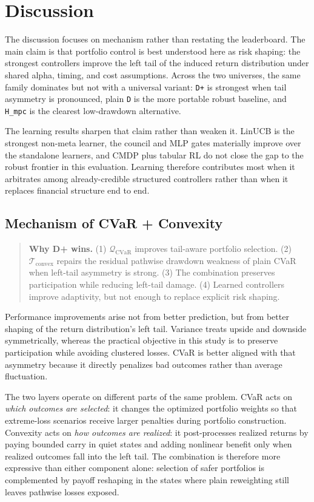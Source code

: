 \documentclass[10pt,twocolumn]{article}
\begin{document}
\section{Discussion}

The discussion focuses on mechanism rather than restating the leaderboard. The
main claim is that portfolio control is best understood here as risk shaping:
the strongest controllers improve the left tail of the induced return
distribution under shared alpha, timing, and cost assumptions. Across the two
universes, the same family dominates but not with a universal variant:
\texttt{D+} is strongest when tail asymmetry is pronounced, plain
\texttt{D} is the more portable robust baseline, and \texttt{H\_mpc} is the
clearest low-drawdown alternative.

The learning results sharpen that claim rather than weaken it. LinUCB is the
strongest non-meta learner, the council and MLP gates materially improve over
the standalone learners, and CMDP plus tabular RL do not close the gap to the
robust frontier in this evaluation. Learning therefore contributes most when it arbitrates among
already-credible structured controllers rather than when it replaces financial
structure end to end.

\subsection{Mechanism of CVaR + Convexity}

\begin{quote}\small\noindent\textbf{Why D+ wins.} (1) $\mathcal{Q}_{\text{CVaR}}$
improves tail-aware portfolio selection. (2)
$\mathcal{T}_{\text{convex}}$ repairs the residual pathwise drawdown weakness
of plain CVaR when left-tail asymmetry is strong. (3) The combination preserves
participation while reducing left-tail damage. (4) Learned controllers improve
adaptivity, but not enough to replace explicit risk shaping.\end{quote}

Performance improvements arise not from better prediction, but from better
shaping of the return distribution's left tail. Variance treats upside and
downside symmetrically, whereas the practical objective in this study is to
preserve participation while avoiding clustered losses. CVaR is better aligned
with that asymmetry because it directly penalizes bad outcomes rather than
average fluctuation.

The two layers operate on different parts of the same problem. CVaR acts on
\emph{which outcomes are selected}: it changes the optimized portfolio weights
so that extreme-loss scenarios receive larger penalties during portfolio
construction. Convexity acts on \emph{how outcomes are realized}: it
post-processes realized returns by paying bounded carry in quiet states and
adding nonlinear benefit only when realized outcomes fall into the left tail.
The combination is therefore more expressive than either component alone:
selection of safer portfolios is complemented by payoff reshaping in the states
where plain reweighting still leaves pathwise losses exposed.
\end{document}
